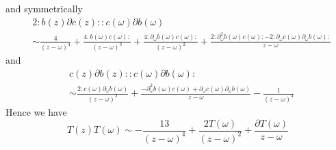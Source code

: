 \documentclass[11pt,a4paper]{article}
\theoremstyle{definition}
\begin{document}
 and symmetrically 
 \[
	\begin{aligned}
	&2: b(z) \partial c(z):: c(\omega) \partial b(\omega)\\
	& \sim \frac{4}{(z-\omega)^4} + \frac{4:b(\omega) c(\omega):}{(z-\omega)^3} + \frac{4 :\partial_\omega b(\omega) c(\omega):}{(z-\omega)^2} + \frac{2: \partial_\omega^2 b(\omega) c(\omega): -2 : \partial_\omega c(\omega) \partial_\omega b(\omega):}{z-\omega} 
	\end{aligned}
 \]
 and
 \[
	\begin{aligned}
	&c(z)\partial b(z) :: c(\omega) \partial b(\omega):\\
	& \sim \frac{2: c(\omega) \partial_{\omega}b(\omega) }{(z-\omega)^2} + \frac{-\partial^2_\omega b(\omega) c(\omega)+\partial_\omega c(\omega)\partial_\omega b(\omega)}{z-\omega} - \frac{1}{(z-\omega)^4}
	\end{aligned}
 \]
 Hence we have 
 \[
 T(z)T(\omega) \sim -\frac{13}{(z-\omega)^4} + \frac{2T(\omega)}{(z-\omega)^2} + \frac{\partial T(\omega)}{z-\omega}
 \]
\end{document}
